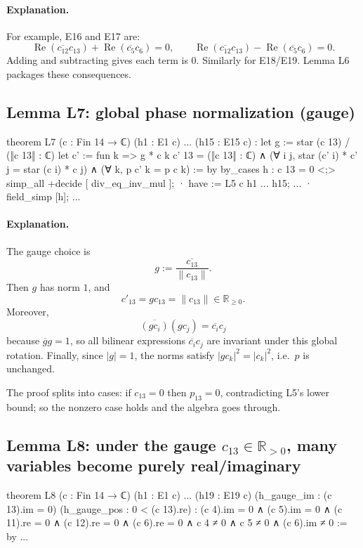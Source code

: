 \documentclass[11pt]{article}
\begin{document}
\paragraph{Explanation.}
For example, E16 and E17 are:
\[
\operatorname{Re}(\overline{c_{12}}c_{13})+\operatorname{Re}(\overline{c_5}c_6)=0,\qquad
\operatorname{Re}(\overline{c_{12}}c_{13})-\operatorname{Re}(\overline{c_5}c_6)=0.
\]
Adding and subtracting gives each term is $0$.  Similarly for E18/E19.
Lemma L6 packages these consequences.

\subsection*{Lemma L7: global phase normalization (gauge)}

\begin{LeanCode}
theorem L7 (c : Fin 14 → ℂ)
  (h1 : E1 c) ... (h15 : E15 c) :
  let g := star (c 13) / (‖c 13‖ : ℂ)
  let c' := fun k => g * c k
  c' 13 = (‖c 13‖ : ℂ) ∧
  (∀ i j, star (c' i) * c' j = star (c i) * c j) ∧
  (∀ k, p c' k = p c k) := by
  by_cases h : c 13 = 0 <;> simp_all +decide [ div_eq_inv_mul ];
  · have := L5 c h1 ... h15; ...
  · field_simp [h]; ...
\end{LeanCode}

\paragraph{Explanation.}
The gauge choice is
\[
g:=\frac{\overline{c_{13}}}{\|c_{13}\|}.
\]
Then $g$ has norm $1$, and
\[
c'_{13} = g c_{13} = \|c_{13}\|\in\mathbb{R}_{\ge 0}.
\]
Moreover,
\[
\overline{(g c_i)}(g c_j)=\overline{c_i}c_j
\]
because $\overline{g}g=1$, so all bilinear expressions $\overline{c_i}c_j$ are invariant under this global rotation.  Finally, since $|g|=1$, the norms satisfy $|g c_k|^2=|c_k|^2$, i.e.\ $p$ is unchanged.

The proof splits into cases: if $c_{13}=0$ then $p_{13}=0$, contradicting L5's lower bound; so the nonzero case holds and the algebra goes through.

\subsection*{Lemma L8: under the gauge $c_{13}\in\mathbb{R}_{>0}$, many variables become purely real/imaginary}

\begin{LeanCode}
theorem L8 (c : Fin 14 → ℂ)
  (h1 : E1 c) ... (h19 : E19 c)
  (h_gauge_im : (c 13).im = 0) (h_gauge_pos : 0 < (c 13).re) :
  (c 4).im = 0 ∧ (c 5).im = 0 ∧
  (c 11).re = 0 ∧ (c 12).re = 0 ∧
  (c 6).re = 0 ∧
  c 4 ≠ 0 ∧ c 5 ≠ 0 ∧ (c 6).im ≠ 0 := by
  ...
\end{LeanCode}
\end{document}

